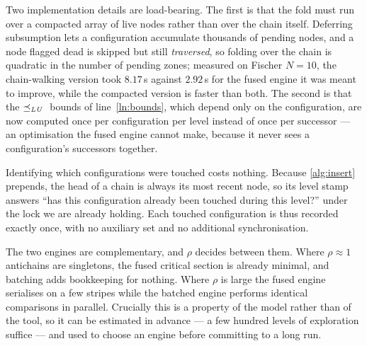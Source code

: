 Two implementation details are load-bearing. The first is that the fold must run over a
compacted array of live nodes rather than over the chain itself. Deferring subsumption lets a
configuration accumulate thousands of pending nodes, and a node flagged dead is skipped but
still \emph{traversed}, so folding over the chain is quadratic in the number of pending zones;
measured on Fischer $N{=}10$, the chain-walking version took $8.17$\,s against $2.92$\,s for
the fused engine it was meant to improve, while the compacted version is faster than both. The
second is that the $\preceq_{\mathit{LU}}{}$ bounds of line~\ref{ln:bounds}, which depend only on the
configuration, are now computed once per configuration per level instead of once per
successor --- an optimisation the fused engine cannot make, because it never sees a
configuration's successors together.

Identifying which configurations were touched costs nothing. Because \cref{alg:insert}
prepends, the head of a chain is always its most recent node, so its level stamp answers
``has this configuration already been touched during this level?'' under the lock we are
already holding. Each touched configuration is thus recorded exactly once, with no auxiliary
set and no additional synchronisation.

The two engines are complementary, and $\rho$ decides between them. Where $\rho \approx 1$
antichains are singletons, the fused critical section is already minimal, and batching adds
bookkeeping for nothing. Where $\rho$ is large the fused engine serialises on a few stripes
while the batched engine performs identical comparisons in parallel. Crucially this is a
property of the model rather than of the tool, so it can be estimated in advance --- a few
hundred levels of exploration suffice --- and used to choose an engine before committing to a
long run.
